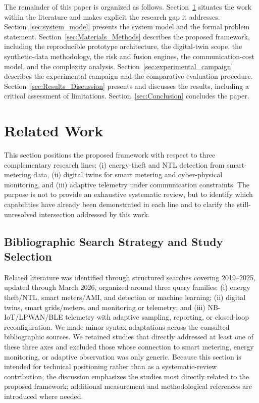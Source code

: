 \documentclass{ieeeaccess}
\begin{document}
The remainder of this paper is organized as follows. Section~\ref{sec:related_work} situates the work within the literature and makes explicit the research gap it addresses. Section~\ref{sec:system_model} presents the system model and the formal problem statement. Section~\ref{sec:Materials_Methods} describes the proposed framework, including the reproducible prototype architecture, the digital-twin scope, the synthetic-data methodology, the risk and fusion engines, the communication-cost model, and the complexity analysis. Section~\ref{sec:experimental_campaign} describes the experimental campaign and the comparative evaluation procedure. Section~\ref{sec:Results_Discussion} presents and discusses the results, including a critical assessment of limitations. Section~\ref{sec:Conclusion} concludes the paper.

\section{Related Work}
\label{sec:related_work}
This section positions the proposed framework with respect to three complementary research lines: (i) energy-theft and NTL detection from smart-metering data, (ii) digital twins for smart metering and cyber-physical monitoring, and (iii) adaptive telemetry under communication constraints. The purpose is not to provide an exhaustive systematic review, but to identify which capabilities have already been demonstrated in each line and to clarify the still-unresolved intersection addressed by this work.

\subsection{Bibliographic Search Strategy and Study Selection}
Related literature was identified through structured searches covering 2019--2025, updated through March 2026, organized around three query families: (i) energy theft/NTL, smart meters/AMI, and detection or machine learning; (ii) digital twins, smart grids/meters, and monitoring or telemetry; and (iii) NB-IoT/LPWAN/BLE telemetry with adaptive sampling, reporting, or closed-loop reconfiguration. We made minor syntax adaptations across the consulted bibliographic sources. We retained studies that directly addressed at least one of these three axes and excluded those whose connection to smart metering, energy monitoring, or adaptive observation was only generic. Because this section is intended for technical positioning rather than as a systematic-review contribution, the discussion emphasizes the studies most directly related to the proposed framework; additional measurement and methodological references are introduced where needed.
\end{document}
